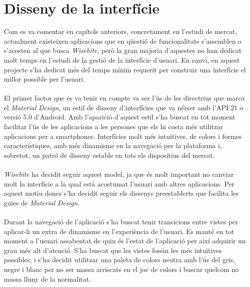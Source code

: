 
\section{Disseny de la interfície}

Com es va comentar en capítols anteriors, concretament en l'estudi de mercat, actualment existeixen aplicacions que en qüestió de funcionalitats s'assemblen o s'acosten al que busca \textit{Wisebite}, però la gran majoria d'aquestes no han dedicat molt temps en l'estudi de la gestió de la interfície d'usuari. En canvi, en aquest projecte s'ha dedicat més del temps mínim requerit per construir una interfície el millor possible per l'usuari.
\\\\
El primer factor que es va tenir en compte va ser l'ús de les directrius que marca el \textit{Material Design}, un estil de disseny d'interfícies que va néixer amb l'API 21 o versió 5.0 d'Android. Amb l'aparició d'aquest estil s'ha buscat en tot moment facilitar l'ús de les aplicacions a les persones que els hi costa més utilitzar aplicacions per a smartphones. Interfícies molt més intuïtives, de colors i formes característiques, amb més dinamisme en la navegació per la plataforma i, sobretot, un patró de disseny estable en tots els dispositius del mercat.
\\\\
\textit{Wisebite} ha decidit seguir aquest model, ja que és molt important no canviar molt la interfície a la qual està acostumat l'usuari amb altres aplicacions. Per aquest motiu doncs s'ha decidit seguir els dissenys preestablerts que facilita les guies de \textit{Material Design}.
\\\\
Durant la navegació de l'aplicació s'ha buscat tenir transicions entre vistes per aplicar-li un extra de dinamisme en l'experiència de l'usuari. Es manté en tot moment a l'usuari assabentat de quin és l'estat de l'aplicació per així adquirir un grau més alt d'atenció. S'ha buscat que les vistes fossin les més intuïtives possibles, i s'ha decidit utilitzar una paleta de colors neutra amb l'ús del gris, negre i blanc per no ser massa arriscats en el joc de colors i buscar quelcom no massa lluny de la normalitat.
\\\\
